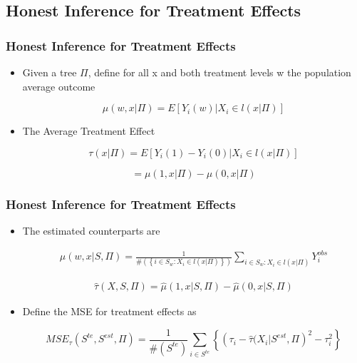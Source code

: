 \documentclass[
  shownotes,
  xcolor={svgnames},
  hyperref={colorlinks,citecolor=DarkBlue,linkcolor=DarkRed,urlcolor=DarkBlue}
  , aspectratio=169]{beamer}
\begin{document}
\subsection{Honest Inference for Treatment Effects}
\begin{frame}[fragile]
\frametitle{Honest Inference for Treatment Effects}

\begin{itemize}
\item Given a tree $\Pi$, define for all x and both treatment levels w the population average outcome



\[
\mu(w,x|\Pi)=E\left[Y_{i}(w)|X_{i}\in l(x|\Pi)\right]
\]

\item The Average Treatment Effect

\[
\tau(x|\Pi)=E\left[Y_{i}(1)-Y_{i}(0)|X_{i}\in l(x|\Pi)\right]
\]

\[
=\mu(1,x|\Pi)-\mu(0,x|\Pi)
\]
\end{itemize}
\end{frame}
\begin{frame}[fragile]
\frametitle{Honest Inference for Treatment Effects}

\begin{itemize}
  \item The estimated counterparts are




\begin{align}
\hat{\mu}(w,x|S,\Pi)=\frac{1}{\#\left(\left\{ i\in S_{w}:X_{i}\in l(x|\Pi)\right\} \right)}\sum_{i\in S_{w}:X_{i}\in l(x|\Pi)}Y_{i}^{obs}
\end{align}

\begin{align}
\hat{\tau}(X,S,\Pi) = \hat{\mu}(1,x|S,\Pi) - \hat{\mu}(0,x|S,\Pi)
\end{align}

\item Define the MSE for treatment effects as

\[
MSE_{\tau}(S^{te},S^{est},\Pi)=\frac{1}{\#(S^{te})}\sum_{i\in S^{te}}\left\{ \left(\tau_{i}-\hat{\tau}(X_{i}|S^{est},\Pi\right)^{2}-\tau_{i}^{2}\right\} 
\]

\end{itemize}
\end{frame}
\end{document}

